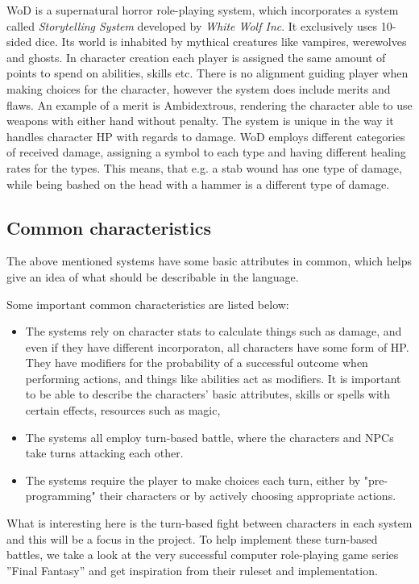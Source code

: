 WoD is a supernatural horror role-playing system, which incorporates a system called \emph{Storytelling System} developed by \emph{White Wolf Inc}. It exclusively uses 10-sided dice\cite{Appelcline2007}. Its world is inhabited by mythical creatures like vampires, werewolves and ghosts. In character creation each player is assigned the same amount of points to spend on abilities, skills etc. There is no alignment guiding player when making choices for the character, however the system does include merits and flaws. An example of a merit is Ambidextrous, rendering the character able to use weapons with either hand without penalty. The system is unique in the way it handles character HP with regards to damage. WoD employs different categories of received damage, assigning a symbol to each type and having different healing rates for the types.\cite{wod} This means, that e.g. a stab wound has one type of damage, while being bashed on the head with a hammer is a different type of damage.

\subsection{Common characteristics}
\label{baseclasses}
The above mentioned systems have some basic attributes in common, which helps give an idea of what should be describable in the language.

Some important common characteristics are listed below:
\begin{itemize}
	\item The systems rely on character stats to calculate things such as damage, and even if they have different incorporaton, all characters have some form of HP. They have modifiers for the probability of a successful outcome when performing actions, and things like abilities act as modifiers. It is important to be able to describe the characters' basic attributes, skills or spells with certain effects, resources such as magic, 
	\item The systems all employ turn-based battle, where the characters and NPCs take turns attacking each other. 
	\item The systems require the player to make choices each turn, either by "pre-programming" their characters or by actively choosing appropriate actions.
\end{itemize}

What is interesting here is the turn-based fight between characters in each system and this will be a focus in the project.
To help implement these turn-based battles, we take a look at the very successful computer role-playing game series ''Final Fantasy'' and get inspiration from their ruleset and implementation.

